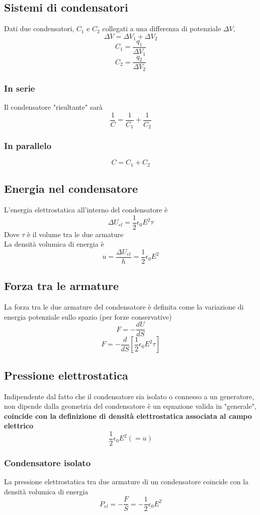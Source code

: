 \documentclass[a4paper]{report}
\begin{document}
  \subsection{Sistemi di condensatori}
  Dati due condensatori, $C_1$ e $C_2$ collegati a una differenza di potenziale $\Delta V$,
  $$ \Delta V = \Delta V_1 + \Delta V_2 $$
  $$ C_1 = \frac{q_1}{\Delta V_1} $$
  $$ C_2 = \frac{q_2}{\Delta V_2} $$

  \subsubsection{In serie}
  Il condensatore "risultante" sarà
  $$ \frac{1}{C} = \frac{1}{C_1} + \frac{1}{C_2} $$

  \subsubsection{In parallelo}
  $$ C = C_1 + C_2 $$

  \subsection{Energia nel condensatore}
  L'energia elettrostatica all'interno del condensatore è
  $$ \Delta U_{el} = \frac{1}{2} \epsilon_0 E^2 \tau $$
  Dove $\tau$ è il volume tra le due armature\\
  La densità volumica di energia è
  $$ u = \frac{\Delta U_{el}}{h} = \frac{1}{2} \epsilon_0 E^2 $$

  \subsection{Forza tra le armature}
  La forza tra le due armature del condensatore è definita come la variazione di energia potenziale sullo spazio (per forze conservative)
  $$ F = -\frac{dU}{dS} $$
  $$ F = -\frac{d}{dS}[\frac{1}{2} \epsilon_0 E^2 \tau] $$

  \subsection{Pressione elettrostatica}
  Indipendente dal fatto che il condensatore sia isolato o connesso a un generatore, non dipende dalla geometria del condensatore è un equazione valida in "generale", \textbf{coincide con la definizione di densità elettrostatica associata al campo elettrico}
  $$ \frac{1}{2} \epsilon_0 E^2 (=u) $$

  \subsubsection{Condensatore isolato}
  La pressione elettrostatica tra due armature di un condensatore coincide con la densità volumica di energia
  $$ P_{el} = - \frac{F}{S} = -\frac{1}{2} \epsilon_0 E^2 $$
\end{document}
